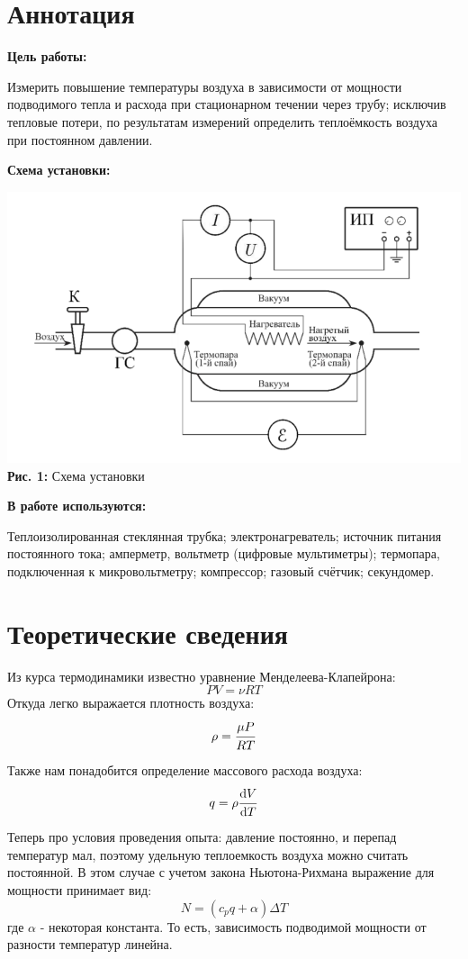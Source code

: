 \documentclass[12pt,a4paper]{scrartcl}
\begin{document}
	\section{Аннотация}
	
	\textbf{Цель работы: }
	
	Измерить повышение температуры воздуха в зависимости от мощности подводимого
	тепла и расхода при стационарном течении через трубу; исключив тепловые потери, по результатам
	измерений определить теплоёмкость воздуха при постоянном давлении.
	
	\textbf{Схема установки:}
	\begin{center}
		\includegraphics[scale=0.3]{PIC_1.png}
		\\\textbf{Рис. 1:} Схема установки
	\end{center}
		
	\textbf{В работе используются:}
	
	Теплоизолированная стеклянная трубка; электронагреватель; источник питания постоянного тока; амперметр, вольтметр (цифровые мультиметры); термопара, подключенная к микровольтметру; компрессор; газовый счётчик; секундомер.
	
	\section{Теоретические сведения}
	Из курса термодинамики известно уравнение Менделеева-Клапейрона:
	$$PV = \nu RT$$
	Откуда легко выражается плотность воздуха:
	$$\rho = \dfrac{\strut \mu P}{\strut RT}$$
	Также нам понадобится определение массового расхода воздуха:
	$$q = \rho \dfrac{\strut \mathrm{d} V}{\strut \mathrm{d} T}$$
	Теперь про условия проведения опыта: давление постоянно, и перепад температур мал, поэтому удельную теплоемкость воздуха можно считать постоянной. В этом случае с учетом закона Ньютона-Рихмана выражение для мощности принимает вид:
	$$N = (c_p q + \alpha)\Delta T$$
	где $\alpha$ - некоторая константа. То есть, зависимость подводимой мощности от разности температур линейна.
	
\end{document}
